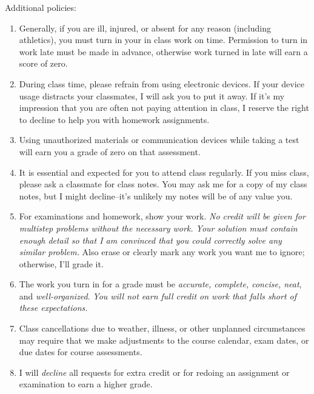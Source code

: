\documentclass[12pt]{article}
\newcounter{ex}\setcounter{ex}{0}
\begin{document}
Additional policies:
\begin{enumerate}

\item Generally, if you are ill, injured,  or absent for any reason (including 
athletics), you must turn in your in class work on time. Permission to
turn in work late must be made in advance, otherwise work turned in 
late will earn a score of zero.

\item During class time, please refrain from using electronic devices. If your 
device usage distracts your classmates, I will ask you to put it away. If it's my 
impression that you are often not paying attention in class, I reserve the right to 
decline to help you with homework assignments.



\item Using unauthorized materials or communication devices while taking a 
test will earn you a grade of zero on that assessment.  

\item It is essential and expected for you to attend class regularly. If you miss class, 
please ask a classmate for class notes. You may ask me for a copy 
of my class notes, but I might decline--it's unlikely my notes will be of any value 
you.

\item For examinations and homework, show your work.  
\emph{No credit will be given for multistep problems without the necessary work. Your solution must contain enough detail
so that I am convinced that you could correctly solve any similar problem.} Also erase or clearly mark any work you want me to ignore; otherwise,
I'll grade it.  

\item The work you turn in for a grade must be \emph{accurate, 
complete, concise, neat}, and \emph{well-organized}.  
\emph{You will not earn full credit on work that falls short of 
these expectations.}

\item Class cancellations due to weather, illness, or other 
unplanned circumstances may require that we make  adjustments
to the course calendar, exam dates, or due dates for 
course assessments. 

\item I will \emph{decline} all requests for extra credit or for
redoing an assignment or examination to earn a higher grade.


\end{enumerate}
\end{document}
